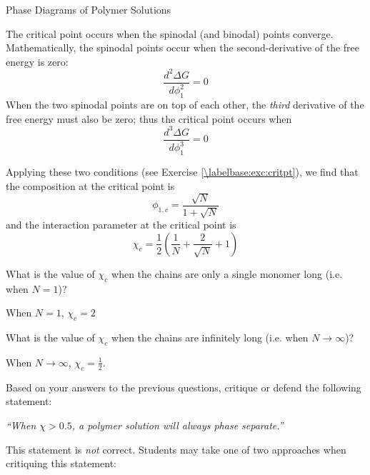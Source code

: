 \begin{activity}{Phase Diagrams of Polymer Solutions}
\begin{infobox}
	The critical point occurs when the spinodal (and binodal) points converge.  Mathematically, the spinodal points occur when the second-derivative of the free energy is zero:
	\begin{equation*}
		\frac{d^2\Delta G}{d\phi_1^2} = 0
	\end{equation*}
	When the two spinodal points are on top of each other, the \emph{third} derivative of the free energy must also be zero; thus the critical point occurs when 
	\begin{equation*}
		\frac{d^3\Delta G}{d\phi_1^3} = 0
	\end{equation*}
	
	Applying these two conditions (see Exercise \ref{\labelbase:exc:critpt}), we find that the composition at the critical point is
	\begin{equation*}
		\phi_{1,c} = \frac{\sqrt{N}}{1+\sqrt{N}}
		\label{\labelbase:eqn:phi1c}
	\end{equation*}
	and the interaction parameter at the critical point is
	\begin{equation*}
		\chi_c = \frac{1}{2}\left(\frac{1}{N} + \frac{2}{\sqrt{N}} + 1\right)
		\label{\labelbase:eqn:chic}
	\end{equation*}
	
\end{infobox}



\begin{ctqs}
	
	\question What is the value of $\chi_c$ when the chains are only a single monomer long (i.e. when $N=1$)?
	
		\begin{solution}[0.75in]
			When $N=1$, $\chi_c = 2$
		\end{solution}
	
	\question What is the value of $\chi_c$ when the chains are infinitely long (i.e. when $N\to\infty$)?	
	
		\begin{solution}[0.75in]
			When $N\to\infty$, $\chi_c = \frac{1}{2}$.
		\end{solution}
	
	\question Based on your answers to the previous questions, critique or defend the following statement:
	
		\emph{``When $\chi > 0.5$, a polymer solution will always phase separate.'' }
	
		\begin{solution}[2.5in]
			This statement is \emph{not} correct.  Students may take one of two approaches when critiquing this statement:
			

\end{solution}
\end{ctqs}
\end{activity}
